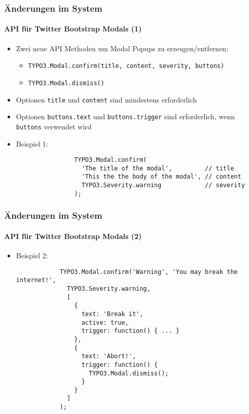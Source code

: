 \begin{frame}[fragile]
	\frametitle{Änderungen im System}
	\framesubtitle{API für Twitter Bootstrap Modals (1)}

	\lstset{basicstyle=\smaller\ttfamily}

	\begin{itemize}

		\item Zwei neue API Methoden um Modal Popups zu erzeugen/entfernen:
			\begin{itemize}
				\item \texttt{TYPO3.Modal.confirm(title, content, severity, buttons)}
				\item \texttt{TYPO3.Modal.dismiss()}
			\end{itemize}

		\item Optionen \texttt{title} und \texttt{content} sind mindestens erforderlich
		\item Optionen \texttt{buttons.text} und \texttt{buttons.trigger} sind erforderlich, wenn \texttt{buttons} verwendet wird

		\item Beispiel 1:

			\begin{lstlisting}
				TYPO3.Modal.confirm(
				  'The title of the modal',         // title
				  'This the the body of the modal', // content
				  TYPO3.Severity.warning            // severity
				);
			\end{lstlisting}

	\end{itemize}

\end{frame}


\begin{frame}[fragile]
	\frametitle{Änderungen im System}
	\framesubtitle{API für Twitter Bootstrap Modals (2)}

	\begin{itemize}

		\item Beispiel 2:

		\begin{lstlisting}
			TYPO3.Modal.confirm('Warning', 'You may break the internet!',
			  TYPO3.Severity.warning,
			  [
			    {
			      text: 'Break it',
			      active: true,
			      trigger: function() { ... }
			    },
			    {
			      text: 'Abort!',
			      trigger: function() {
			        TYPO3.Modal.dismiss();
			      }
			    }
			  ]
			);
		\end{lstlisting}

	\end{itemize}

\end{frame}

